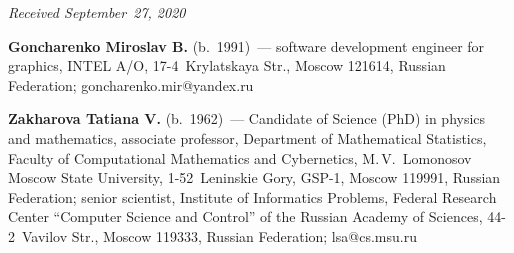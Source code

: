\vspace*{-3pt}

  \hfill{\small\textit{Received September~27, 2020}}




\Contr

\noindent
\textbf{Goncharenko Miroslav B.} (b.\ 1991)~--- 
software development engineer for graphics, INTEL A/O, 17-4~Krylatskaya Str., 
Moscow 121614, Russian Federation; \mbox{goncharenko.mir@yandex.ru}

\vspace*{3pt}

\noindent
\textbf{Zakharova Tatiana V.} (b.\ 1962)~--- 
Candidate of Science (PhD) in physics and mathematics, associate professor, Department
 of Mathematical Statistics, Faculty of Computational Mathematics and Cybernetics, M.\,V.~Lomonosov 
 Moscow State University, 1-52~Leninskie Gory, GSP-1, Moscow 119991, Russian Federation; 
 senior scientist, Institute of Informatics Problems, Federal Research Center 
 ``Computer Science and Control'' of the Russian Academy of Sciences, 44-2~Vavilov Str., Moscow 119333, 
 Russian Federation; \mbox{lsa@cs.msu.ru}
\label{end\stat}

\renewcommand{\bibname}{\protect\rm Литература}